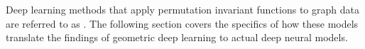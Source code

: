 Deep learning methods that apply permutation invariant functions to graph data are referred to as  \cite{bronstein_geometric_2021}. The following section covers the specifics of how these models translate the findings of geometric deep learning to actual deep neural models.




